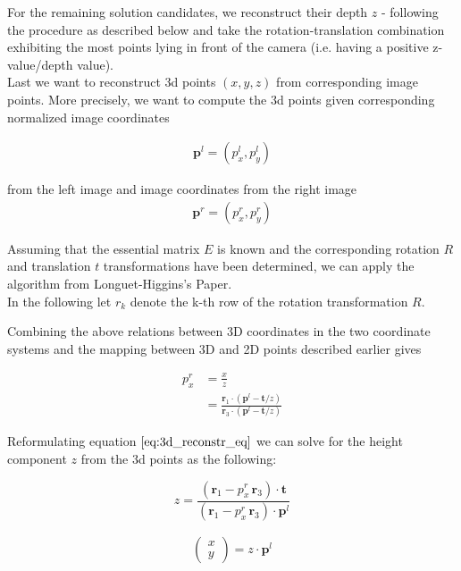 \documentclass{paper}
\begin{document}
For the remaining solution candidates, we reconstruct their depth $z$ - following the procedure as described below and take the rotation-translation combination exhibiting the most points lying in front of the camera (i.e. having a positive z-value/depth value). \\

Last we want to reconstruct 3d points $(x,y,z)$ from corresponding image points. More precisely, we want to compute the 3d points given corresponding normalized image coordinates 

\begin{align}
    \textbf{p}^{l} = (p^{l}_{x}, p^{l}_{y})
\end{align}

from the left image and image coordinates from the right image
\begin{align}
    \textbf{p}^{r} = (p^{r}_{x}, p^{r}_{y})
\end{align}

Assuming that the essential matrix $E$ is known and the corresponding rotation $R$ and translation $t$ transformations have been determined, we can apply the algorithm from Longuet-Higgins's Paper. \\

In the following let $r_k$ denote the k-th row of the rotation transformation $R$.



Combining the above relations between 3D coordinates in the two coordinate systems and the mapping between 3D and 2D points described earlier gives

\begin{align}
    p^{r}_{x} 
    &= \frac{x}{z} \\
    &= \frac{\mathbf{r}_{1} \cdot (\textbf{p}^{l} - \mathbf{t}/z)}{\mathbf{r}_{3} \cdot (\textbf{p}^{l} - \mathbf{t}/z)}  
\end{align}


Reformulating equation $\ref{eq:3d_reconstr_eq}$ we can solve for the height component $z$ from the 3d points as the following:

\begin{equation}
    z =  \frac{ (\mathbf{r}_{1} - p^{r}_{x} \, \mathbf{r}_{3}) \cdot \mathbf{t} }{ (\mathbf{r}_{1} - p^{r}_{x} \, \mathbf{r}_{3}) \cdot \textbf{p}^{l} }
\end{equation}


\begin{align}
\begin{pmatrix} x \\ y \end{pmatrix} = z \cdot \textbf{p}^{l}
\label{eq:find_x_y_3d_points}
\end{align}
\end{document}
